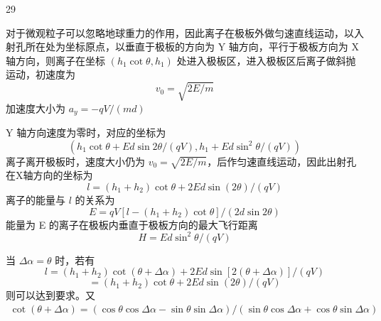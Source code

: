 \begin{solution}{29}
  \begin{subsolution}
    对于微观粒子可以忽略地球重力的作用，因此离子在极板外做匀速直线运动，以入射孔所在处为坐标原点，以垂直于极板的方向为 Y 轴方向，平行于极板方向为 X 轴方向，则离子在坐标 $(h_{1}\cot\theta, h_{1})$ 处进入极板区，进入极板区后离子做斜抛运动，初速度为
    \begin{equation}
      v_{0} = \sqrt{2 E / m}
      \label{eq:1.p29}
    \end{equation}
    加速度大小为 $a_{y} = -qV / (md)$

    Y 轴方向速度为零时，对应的坐标为
    \begin{equation}
      \left(h_{1} \cot \theta + E d \sin 2\theta / (q V), h_{1} + E d \sin^{2} \theta / (q V)\right)
      \label{eq:2.p29}
    \end{equation}
    离子离开极板时，速度大小仍为 $v_{0} = \sqrt{2E / m}$，后作匀速直线运动，因此出射孔在X轴方向的坐标为
    \begin{equation}
      l = (h_{1} + h_{2}) \cot \theta + 2 E d \sin (2 \theta) / (q V)
      \label{eq:3.p29}
    \end{equation}
    离子的能量与 $l$ 的关系为
    \begin{equation}
      E = q V \left[ l - (h_{1} + h_{2}) \cot \theta \right] / (2 d \sin 2 \theta)
      \label{eq:4.p29}
    \end{equation}
    能量为 E 的离子在极板内垂直于极板方向的最大飞行距离
    \begin{equation}
      H = E d \sin^{2} \theta / (q V)
      \label{eq:5.p29}
    \end{equation}
  \end{subsolution}
  \begin{subsolution}
    当 $\Delta\alpha = \theta$ 时，若有
    \begin{equation}
      l = (h_{1} + h_{2}) \cot (\theta + \Delta \alpha) + 2 E d \sin [ 2 (\theta + \Delta \alpha) ] / (q V)
      \label{eq:6.p29}
    \end{equation}
    \begin{equation}
      = (h_{1} + h_{2}) \cot \theta + 2 E d \sin (2 \theta) / (q V)
    \end{equation}
    则可以达到要求。又
    \begin{equation}
      \begin{array}{l}
        \cot (\theta + \Delta \alpha) = (\cos \theta \cos \Delta \alpha - \sin \theta \sin \Delta \alpha) / (\sin \theta \cos \Delta \alpha + \cos \theta \sin \Delta \alpha) \\

\end{array}
\end{equation}
\end{subsolution}
\end{solution}
